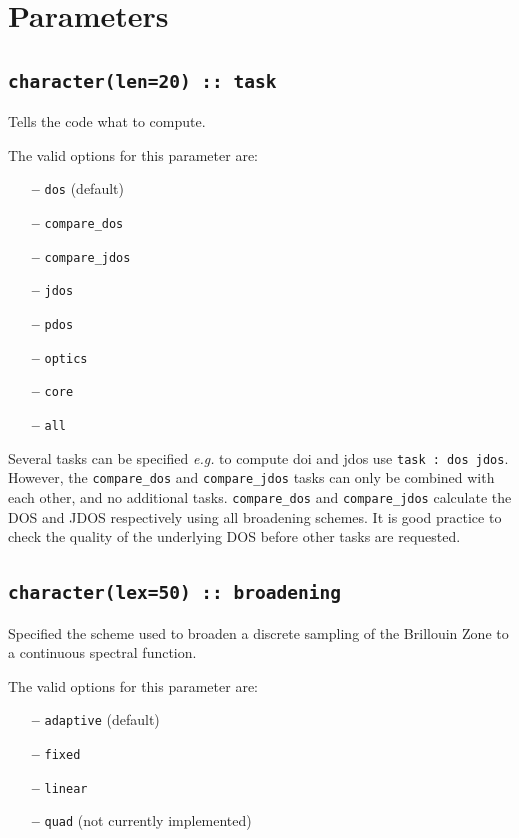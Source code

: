 \documentclass[a4paper,11pt,twoside]{book}
\begin{document}
\clearpage


\section{Parameters}
\subsection[task]{\tt character(len=20) :: task}

Tells the code what to compute. 

The valid options for this parameter are:
\begin{itemize}
\item[{\bf --}]  \verb#dos# (default)
\item[{\bf --}]  \verb#compare_dos#
\item[{\bf --}]  \verb#compare_jdos#
\item[{\bf --}]  \verb#jdos#
\item[{\bf --}]  \verb#pdos#
\item[{\bf --}]  \verb#optics#
\item[{\bf --}]  \verb#core#
\item[{\bf --}]  \verb#all#
\end{itemize}
Several tasks can be specified \emph{e.g.} to compute doi and jdos use
\verb#task : dos jdos#.  
However, the \verb#compare_dos# and \verb#compare_jdos# tasks can only be combined with each other, and no additional tasks.
\verb#compare_dos# and \verb#compare_jdos# calculate the DOS and JDOS respectively using all broadening schemes. It is good practice to check the quality of the underlying DOS before other tasks are requested. 

\subsection[broadening]{\tt character(lex=50) :: broadening}

Specified the scheme used to broaden a discrete sampling of the
Brillouin Zone to a continuous spectral function.

The valid options for this parameter are:
\begin{itemize}
\item[{\bf --}]  \verb#adaptive# (default)
\item[{\bf --}]  \verb#fixed#
\item[{\bf --}]  \verb#linear#
\item[{\bf --}]  \verb#quad# (not currently implemented)
\end{itemize}
\end{document}
